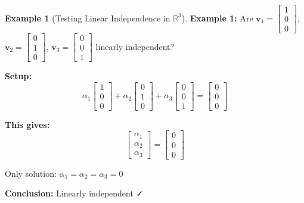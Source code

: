 \documentclass[12pt,a4paper]{article}
\theoremstyle{definition}
\newtheorem{example}{Example}[section]
\begin{document}
\begin{example}[Testing Linear Independence in $\mathbb{R}^3$]
\textbf{Example 1:} Are $\mathbf{v}_1 = \begin{bmatrix} 1 \\ 0 \\ 0 \end{bmatrix}$, $\mathbf{v}_2 = \begin{bmatrix} 0 \\ 1 \\ 0 \end{bmatrix}$, $\mathbf{v}_3 = \begin{bmatrix} 0 \\ 0 \\ 1 \end{bmatrix}$ linearly independent?

\textbf{Setup:}
\begin{equation}
\alpha_1\begin{bmatrix} 1 \\ 0 \\ 0 \end{bmatrix} + \alpha_2\begin{bmatrix} 0 \\ 1 \\ 0 \end{bmatrix} + \alpha_3\begin{bmatrix} 0 \\ 0 \\ 1 \end{bmatrix} = \begin{bmatrix} 0 \\ 0 \\ 0 \end{bmatrix}
\end{equation}

\textbf{This gives:}
\begin{equation}
\begin{bmatrix} \alpha_1 \\ \alpha_2 \\ \alpha_3 \end{bmatrix} = \begin{bmatrix} 0 \\ 0 \\ 0 \end{bmatrix}
\end{equation}

Only solution: $\alpha_1 = \alpha_2 = \alpha_3 = 0$

\textbf{Conclusion:} Linearly independent ✓


\end{example}
\end{document}
